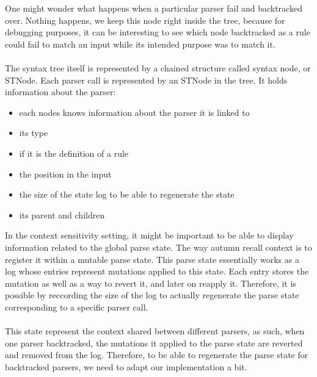 	One might wonder what happens when a particular parser fail and backtracked over. Nothing happens, we keep this node right inside the tree, because for debugging purposes, it can be interesting to see which node backtracked as a rule could fail to match an input while its intended purpose was to match it.

	\paragraph{}

	The syntax tree itself is represented by a chained structure called syntax node, or STNode. Each parser call is represented by an STNode in the tree. It holds information about the parser:

	\begin{itemize}
		\item each nodes knows information about the parser it is linked to
		\item its type
		\item if it is the definition of a rule
		\item the position in the input
		\item the size of the state log to be able to regenerate the state
		\item its parent and children
	\end{itemize}

	In the context sensitivity setting, it might be important to be able to display information related to the global parse state. The way autumn recall context is to register it within a mutable parse state. This parse state essentially works as a log whose entries represent mutations applied to this state. Each entry stores the mutation as well as a way to revert it, and later on reapply it. Therefore, it is possible by reccording the size of the log to actually regenerate the parse state corresponding to a specific parser call.

	\paragraph{}

	This state represent the context shared between different parsers, as such, when one parser backtracked, the mutations it applied to the parse state are reverted and removed from the log. Therefore, to be able to regenerate the parse state for backtracked parsers, we need to adapt our implementation a bit.

	\paragraph{}

